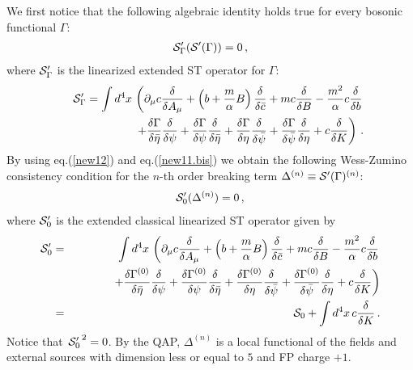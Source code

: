 \documentclass[a4paper,11pt]{article}
\def\G{\Gamma}
\begin{document}
We first notice that the following algebraic identity holds true
for every bosonic functional $\G$:
%
\begin{eqnarray}
{\cal S}'_{\G} ({\cal S}'(\G)) = 0 \, ,
\label{new12}
\end{eqnarray}
%
where ${\cal S}'_{\G}$ is the linearized extended ST operator for $\G$:
%
\begin{eqnarray}
&& {\cal S}'_\G = 
\int d^4x \, 
\left (
\partial_\mu c {\delta \over \delta A_\mu}
+ \left ( b + {m \over \alpha} B \right )
 {\delta  \over \delta \bar c}
+mc {\delta \over \delta B}
- {m^2 \over \alpha} c {\delta \over \delta b}
\right .
\nonumber \\
&&
\left . 
~~~~~~~~~~~~~~~~~~
+ {\delta \G \over \delta \bar \eta}
{\delta \over \delta \psi}
+ 
{\delta \G \over \delta \psi}
 {\delta \over \delta \bar \eta}
+ {\delta \G \over \delta \eta} 
{\delta \over \delta \bar \psi}
+ 
{\delta \G \over \delta \bar \psi}
{\delta \over \delta \eta} 
+ c {\delta \over \delta K}
\right )  \, .
\label{new13}
\end{eqnarray}
%
By using eq.(\ref{new12}) and eq.(\ref{new11.bis}) 
we obtain the following Wess-Zumino
consistency condition for the $n$-th order breaking term
$\Delta^{(n)} \equiv {\cal S}'(\G)^{(n)}$:
%
\begin{eqnarray}
{\cal S}'_0 (\Delta^{(n)}) = 0 \, ,
\label{new14}
\end{eqnarray}
%
where ${\cal S}'_0$ is the extended classical linearized ST operator
given by
%
\begin{eqnarray}
{\cal S}'_0 & = &
\int d^4x \, 
\left (
\partial_\mu c {\delta \over \delta A_\mu}
+ \left ( b + {m \over \alpha} B \right )
{\delta  \over \delta \bar c}
+mc {\delta \over \delta B}
- {m^2 \over \alpha} c {\delta \over \delta b}
\right . \nonumber \\
&& ~~~~~~~~~~  \left . 
+ {\delta \G^{(0)} \over \delta \bar \eta}
{\delta \over \delta \psi}
+ 
{\delta \G^{(0)} \over \delta \psi}
 {\delta \over \delta \bar \eta}
+ {\delta \G^{(0)} \over \delta \eta} 
{\delta \over \delta \bar \psi}
+
{\delta \G^{(0)} \over \delta \bar \psi}
 {\delta \over \delta \eta} 
+ c {\delta \over \delta K}
\right )  \nonumber \\
& = & {\cal S}_0 + \int d^4x \, c {\delta \over \delta K} \, .
\label{new15}
\end{eqnarray}
%
Notice that $\left . {\cal S}'_0 \right . ^2=0$.
By the QAP, $\Delta^{(n)}$ is a local functional of the fields
and external sources with dimension less or equal to $5$ and
FP charge $+1$.
\end{document}
